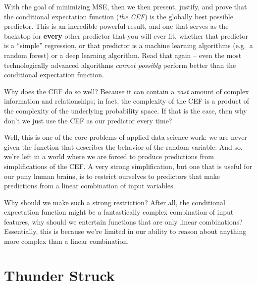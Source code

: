 \documentclass[
]{book}
\theoremstyle{definition}
\theoremstyle{definition}
\theoremstyle{definition}
\theoremstyle{definition}
\theoremstyle{remark}
\begin{document}
With the goal of minimizing MSE, then we then present, justify, and prove that the conditional expectation function (\emph{the CEF}) is the globally best possible predictor. This is an incredible powerful result, and one that serves as the backstop for \textbf{every} other predictor that you will ever fit, whether that predictor is a ``simple'' regression, or that predictor is a machine learning algorithms (e.g.~a random forest) or a deep learning algorithm. Read that again -- even the most technologically advanced algorithms \emph{cannot possibly} perform better than the conditional expectation function.

Why does the CEF do so well? Because it can contain a \emph{vast} amount of complex information and relationships; in fact, the complexity of the CEF is a product of the complexity of the underlying probability space. If that is the case, then why don't we just use the CEF as our predictor every time?

Well, this is one of the core problems of applied data science work: we are never given the function that describes the behavior of the random variable. And so, we're left in a world where we are forced to produce predictions from simplifications of the CEF. A very strong simplification, but one that is useful for our puny human brains, is to restrict ourselves to predictors that make predictions from a linear combination of input variables.

Why should we make such a strong restriction? After all, the conditional expectation function might be a fantastically complex combination of input features, why should we entertain functions that are only linear combinations? Essentially, this is because we're limited in our ability to reason about anything more complex than a linear combination.

\hypertarget{thunder-struck}{%
\section{Thunder Struck}\label{thunder-struck}}
\end{document}

